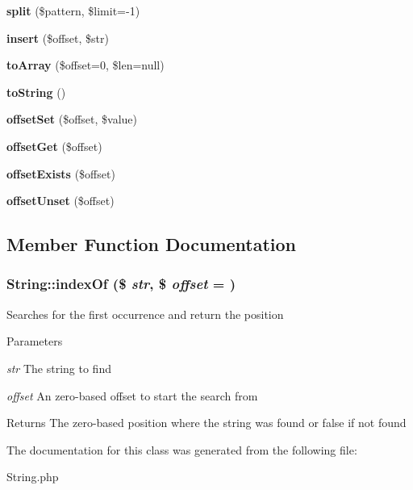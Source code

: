 \begin{DoxyCompactItemize}
\item 
\hypertarget{classString_af1ceaa53461e40a69de4f14a115d7d56}{
{\bfseries split} (\$pattern, \$limit=-\/1)}
\label{classString_af1ceaa53461e40a69de4f14a115d7d56}

\item 
\hypertarget{classString_abe7d7e1e2b57ab7dcd01d8e2d1d53148}{
{\bfseries insert} (\$offset, \$str)}
\label{classString_abe7d7e1e2b57ab7dcd01d8e2d1d53148}

\item 
\hypertarget{classString_abacf7b1614b42312f4f49ca064980139}{
{\bfseries toArray} (\$offset=0, \$len=null)}
\label{classString_abacf7b1614b42312f4f49ca064980139}

\item 
\hypertarget{classString_aa7ef98a0c1a4b8b375baf8791e7b773c}{
{\bfseries toString} ()}
\label{classString_aa7ef98a0c1a4b8b375baf8791e7b773c}

\item 
\hypertarget{classString_a6a17056cddb17560a093b846c6168537}{
{\bfseries offsetSet} (\$offset, \$value)}
\label{classString_a6a17056cddb17560a093b846c6168537}

\item 
\hypertarget{classString_a4627964e8bc80f485b4b7c1b1c609820}{
{\bfseries offsetGet} (\$offset)}
\label{classString_a4627964e8bc80f485b4b7c1b1c609820}

\item 
\hypertarget{classString_a0ad487f2acca3753cd9d42cf9325225e}{
{\bfseries offsetExists} (\$offset)}
\label{classString_a0ad487f2acca3753cd9d42cf9325225e}

\item 
\hypertarget{classString_af12691beca61c36ac057a8515b2f4bfe}{
{\bfseries offsetUnset} (\$offset)}
\label{classString_af12691beca61c36ac057a8515b2f4bfe}

\end{DoxyCompactItemize}


\subsection{Member Function Documentation}
\hypertarget{classString_a5069041d10f95e4ec9a4be3cd17ab180}{
\subsubsection[{indexOf}]{\setlength{\rightskip}{0pt plus 5cm}String::indexOf (\$ {\em str}, \/  \$ {\em offset} = {})}}
\label{classString_a5069041d10f95e4ec9a4be3cd17ab180}
Searches for the first occurrence and return the position 
\begin{DoxyParams}{Parameters}
\item[{\em str}]The string to find \item[{\em offset}]An zero-\/based offset to start the search from \end{DoxyParams}
\begin{DoxyReturn}{Returns}
The zero-\/based position where the string was found or false if not found 
\end{DoxyReturn}


The documentation for this class was generated from the following file:\begin{DoxyCompactItemize}
\item 
String.php\end{DoxyCompactItemize}
